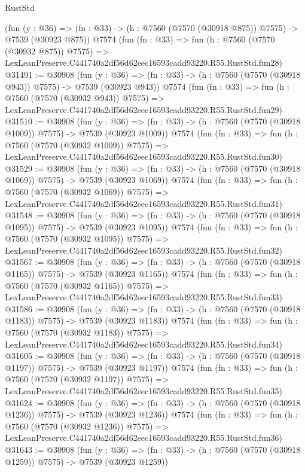 \begin{lexlean}{RustStd}
\begin{coremodule}
    (fun (y : @36) => (fn : @33) -> (h : @7560 (@7570 (@30918 @875)) @7575) -> @7539 (@30923 @875))
    @7574
    (fun (fn : @33) =>
    fun (h : @7560 (@7570 (@30932 @875)) @7575) =>
    LexLeanPreserve.C441740a2df56d62eec16593cadd93220.R55.RustStd.fun28)
@31491 := @30908
    (fun (y : @36) => (fn : @33) -> (h : @7560 (@7570 (@30918 @943)) @7575) -> @7539 (@30923 @943))
    @7574
    (fun (fn : @33) =>
    fun (h : @7560 (@7570 (@30932 @943)) @7575) =>
    LexLeanPreserve.C441740a2df56d62eec16593cadd93220.R55.RustStd.fun29)
@31510 := @30908
    (fun (y : @36) =>
    (fn : @33) -> (h : @7560 (@7570 (@30918 @1009)) @7575) -> @7539 (@30923 @1009))
    @7574
    (fun (fn : @33) =>
    fun (h : @7560 (@7570 (@30932 @1009)) @7575) =>
    LexLeanPreserve.C441740a2df56d62eec16593cadd93220.R55.RustStd.fun30)
@31529 := @30908
    (fun (y : @36) =>
    (fn : @33) -> (h : @7560 (@7570 (@30918 @1069)) @7575) -> @7539 (@30923 @1069))
    @7574
    (fun (fn : @33) =>
    fun (h : @7560 (@7570 (@30932 @1069)) @7575) =>
    LexLeanPreserve.C441740a2df56d62eec16593cadd93220.R55.RustStd.fun31)
@31548 := @30908
    (fun (y : @36) =>
    (fn : @33) -> (h : @7560 (@7570 (@30918 @1095)) @7575) -> @7539 (@30923 @1095))
    @7574
    (fun (fn : @33) =>
    fun (h : @7560 (@7570 (@30932 @1095)) @7575) =>
    LexLeanPreserve.C441740a2df56d62eec16593cadd93220.R55.RustStd.fun32)
@31567 := @30908
    (fun (y : @36) =>
    (fn : @33) -> (h : @7560 (@7570 (@30918 @1165)) @7575) -> @7539 (@30923 @1165))
    @7574
    (fun (fn : @33) =>
    fun (h : @7560 (@7570 (@30932 @1165)) @7575) =>
    LexLeanPreserve.C441740a2df56d62eec16593cadd93220.R55.RustStd.fun33)
@31586 := @30908
    (fun (y : @36) =>
    (fn : @33) -> (h : @7560 (@7570 (@30918 @1183)) @7575) -> @7539 (@30923 @1183))
    @7574
    (fun (fn : @33) =>
    fun (h : @7560 (@7570 (@30932 @1183)) @7575) =>
    LexLeanPreserve.C441740a2df56d62eec16593cadd93220.R55.RustStd.fun34)
@31605 := @30908
    (fun (y : @36) =>
    (fn : @33) -> (h : @7560 (@7570 (@30918 @1197)) @7575) -> @7539 (@30923 @1197))
    @7574
    (fun (fn : @33) =>
    fun (h : @7560 (@7570 (@30932 @1197)) @7575) =>
    LexLeanPreserve.C441740a2df56d62eec16593cadd93220.R55.RustStd.fun35)
@31624 := @30908
    (fun (y : @36) =>
    (fn : @33) -> (h : @7560 (@7570 (@30918 @1236)) @7575) -> @7539 (@30923 @1236))
    @7574
    (fun (fn : @33) =>
    fun (h : @7560 (@7570 (@30932 @1236)) @7575) =>
    LexLeanPreserve.C441740a2df56d62eec16593cadd93220.R55.RustStd.fun36)
@31643 := @30908
    (fun (y : @36) =>
    (fn : @33) -> (h : @7560 (@7570 (@30918 @1259)) @7575) -> @7539 (@30923 @1259))

\end{coremodule}
\end{lexlean}
